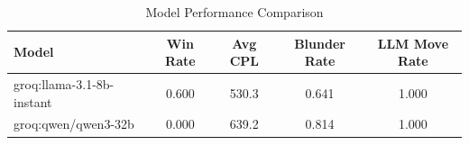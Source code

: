 \begin{table}[h]
\centering
\caption{Model Performance Comparison}
\begin{tabular}{lcccc}
\toprule
Model & Win Rate & Avg CPL & Blunder Rate & LLM Move Rate \\
\midrule
groq:llama-3.1-8b-instant & 0.600 & 530.3 & 0.641 & 1.000 \\
groq:qwen/qwen3-32b & 0.000 & 639.2 & 0.814 & 1.000 \\
\bottomrule
\end{tabular}
\end{table}